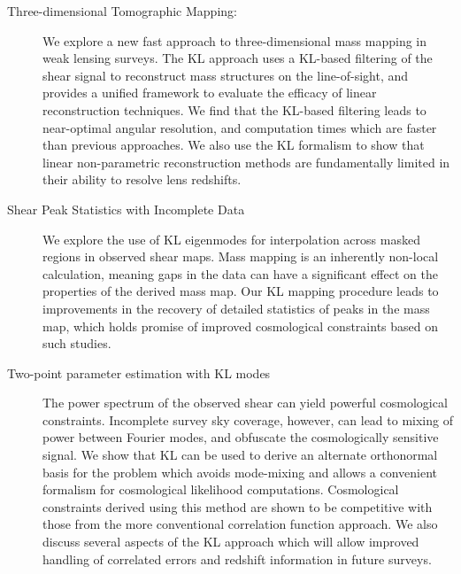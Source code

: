 {\begin{description}
   \item[Three-dimensional Tomographic Mapping:]
        \citep[Based on work published in][]{Vanderplas2011}
        We explore a new fast approach to three-dimensional mass mapping in
        weak lensing surveys.  The KL approach uses a KL-based filtering of
        the shear signal to reconstruct mass structures on the line-of-sight,
        and provides a unified framework to evaluate the efficacy of linear
        reconstruction techniques.  We find that the KL-based filtering leads
        to near-optimal angular resolution, and computation times which are
        faster than previous approaches.  We also use the KL formalism to
        show that linear non-parametric reconstruction methods are
        fundamentally limited in their ability to resolve lens redshifts.
   \item[Shear Peak Statistics with Incomplete Data]
        \citep[Based on work published in][]{Vanderplas2012}
        We explore the use of KL eigenmodes for interpolation across masked     
        regions in observed shear maps.  Mass mapping is an inherently
        non-local calculation, meaning gaps in the data can have a significant
        effect on the properties of the derived mass map.  Our KL mapping
        procedure leads to improvements in the recovery of detailed statistics
        of peaks in the mass map, which holds promise of improved cosmological
        constraints based on such studies.
   \item[Two-point parameter estimation with KL modes]
        The power spectrum of the observed shear can yield powerful cosmological
        constraints.  Incomplete survey sky coverage, however, can lead to
        mixing of power between Fourier modes, and obfuscate the cosmologically
        sensitive signal.  We show that KL can be used to derive an alternate
        orthonormal basis for the problem which avoids mode-mixing and allows
        a convenient formalism for cosmological likelihood computations.
        Cosmological constraints derived using this method are shown to be
        competitive with those from the more conventional correlation function
        approach.  We also discuss several aspects of the KL approach which
        will allow improved handling of correlated errors and redshift
        information in future surveys.
\end{description}










}
